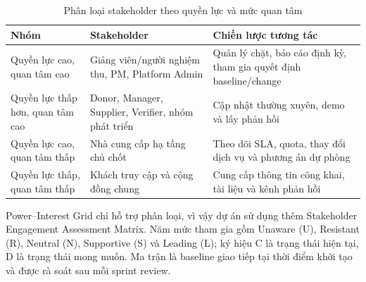 \begin{table}[H]
\centering
\caption{Phân loại stakeholder theo quyền lực và mức quan tâm}
\label{tab:stakeholder-grid}
\begin{tabularx}{\textwidth}{| p{3.7cm} | p{4cm} | X |}
\hline
\textbf{Nhóm} & \textbf{Stakeholder} & \textbf{Chiến lược tương tác} \\
\hline
Quyền lực cao, quan tâm cao & Giảng viên/người nghiệm thu, PM, Platform Admin & Quản lý chặt, báo cáo định kỳ, tham gia quyết định baseline/change \\ \hline
Quyền lực thấp hơn, quan tâm cao & Donor, Manager, Supplier, Verifier, nhóm phát triển & Cập nhật thường xuyên, demo và lấy phản hồi \\ \hline
Quyền lực cao, quan tâm thấp & Nhà cung cấp hạ tầng chủ chốt & Theo dõi SLA, quota, thay đổi dịch vụ và phương án dự phòng \\ \hline
Quyền lực thấp, quan tâm thấp & Khách truy cập và cộng đồng chung & Cung cấp thông tin công khai, tài liệu và kênh phản hồi \\
\hline
\end{tabularx}
\end{table}


Power--Interest Grid chỉ hỗ trợ phân loại, vì vậy dự án sử dụng thêm Stakeholder Engagement Assessment Matrix. Năm mức tham gia gồm Unaware (U), Resistant (R), Neutral (N), Supportive (S) và Leading (L); ký hiệu C là trạng thái hiện tại, D là trạng thái mong muốn. Ma trận là baseline giao tiếp tại thời điểm khởi tạo và được rà soát sau mỗi sprint review.

